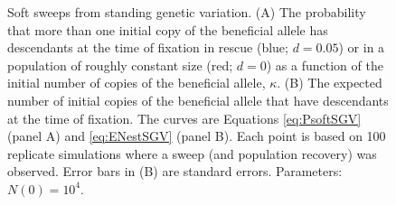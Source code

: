 \documentclass[]{article}
\begin{document}
\begin{figure}[htb]
\centering
{}
\caption{
Soft sweeps from standing genetic variation.
(A) The probability that more than one initial copy of the beneficial allele has descendants at the time of fixation in rescue (blue; $d=0.05$) or in a population of roughly constant size (red; $d=0$) as a function of the initial number of copies of the beneficial allele, $\kappa$.
(B) The expected number of initial copies of the beneficial allele that have descendants at the time of fixation.
The curves are Equations \ref{eq:PsoftSGV} (panel A) and \ref{eq:ENestSGV} (panel B).
Each point is based on 100 replicate simulations where a sweep (and population recovery) was observed.
Error bars in (B) are standard errors.
Parameters: $N(0)=10^4$.
}%
\label{fig:PsoftSGV}
\end{figure}
\end{document}
